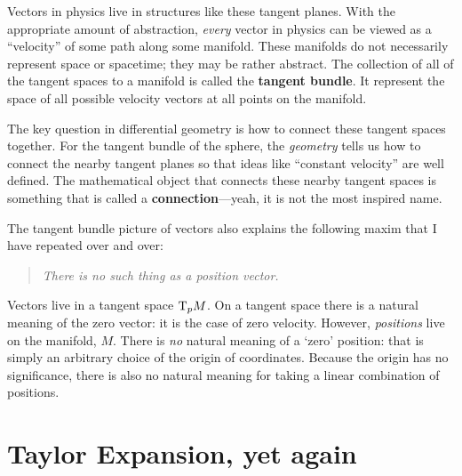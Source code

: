 \documentclass[12pt, oneside]{report}    %
\let\oldsection\section
\def\section{%
  \setcounter{sidenote}{1}%
  \oldsection
}
\begin{document}
Vectors in physics live in structures like these tangent planes. With the appropriate amount of abstraction, \emph{every} vector in physics can be viewed as a ``velocity'' of some path along some manifold. These manifolds do not necessarily represent space or spacetime; they may be rather abstract. The collection of all of the tangent spaces to a manifold is called the \textbf{tangent bundle}. It represent the space of all possible velocity vectors at all points on the manifold.

The key question in differential geometry is how to connect these tangent spaces together. For the tangent bundle of the sphere, the \emph{geometry} tells us how to connect the nearby tangent planes so that ideas like ``constant velocity'' are well defined. The mathematical object that connects these nearby tangent spaces is something that is called a \textbf{connection}---yeah, it is not the most inspired name.

The tangent bundle picture of vectors also explains the following maxim that I have repeated over and over:
\begin{quote}
\emph{There is no such thing as a position vector.}
\end{quote}
Vectors live in a tangent space $\textnormal{T}_pM$. On a tangent space there is a natural meaning of the zero vector: it is the case of zero velocity. However, \emph{positions} live on the manifold, $M$. There is \emph{no} natural meaning of a `zero' position: that is simply an arbitrary choice of the origin of coordinates. Because the origin has no significance, there is also no natural meaning for taking a linear combination of positions.



\section{Taylor Expansion, yet again}
\end{document}
